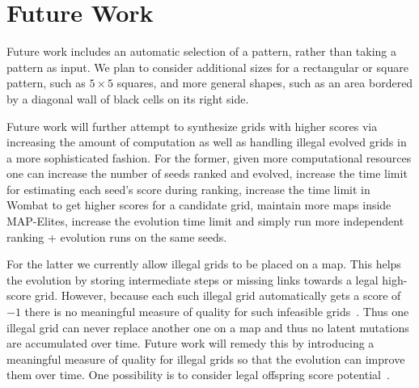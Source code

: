 \section{Future Work}

Future work includes an automatic selection of a pattern, rather than taking a pattern as input.
We plan to consider additional sizes for a rectangular or square pattern, such as $5 \times 5$ squares, and 
more general shapes, such as an area bordered by a diagonal wall of black cells on its right side.

Future work will further attempt to synthesize grids with higher scores via increasing the amount of computation as well as handling illegal evolved grids in a more sophisticated fashion. For the former, given more computational resources one can increase the number of seeds ranked and evolved, increase the time limit for estimating each seed's score during ranking, increase the time limit in {\sc Wombat} to get higher scores for a candidate grid, maintain more maps inside MAP-Elites, increase the evolution time limit and simply run more independent ranking + evolution runs on the same seeds. 

For the latter we currently allow illegal grids to be placed on a map. This helps the evolution by storing intermediate steps or missing links towards a legal high-score grid. However, because each such illegal grid automatically gets a score of $-1$ there is no meaningful measure of quality for such infeasible grids~\cite{FI2Pop}. Thus one illegal grid can never replace another one on a map and thus no latent mutations are accumulated over time. Future work will remedy this by introducing a meaningful measure of quality for illegal grids so that the evolution can improve them over time. One possibility is to consider legal offspring score potential~\cite{Gallotta_2022}.